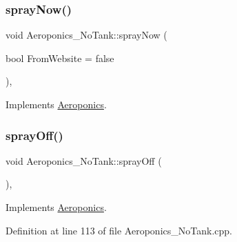\subsubsection{\texorpdfstring{spray\+Now()}{sprayNow()}\hspace{0.1cm}{\footnotesize\ttfamily [2/2]}}
{\footnotesize\ttfamily void Aeroponics\+\_\+\+No\+Tank\+::spray\+Now (\begin{DoxyParamCaption}\item[{bool}]{From\+Website = {\ttfamily false} }\end{DoxyParamCaption})\hspace{0.3cm}{\ttfamily [protected]}, {\ttfamily [virtual]}}



Implements \hyperlink{class_aeroponics_aecda76aae20ce45fd9a080770cf07e56}{Aeroponics}.

\mbox{\label{class_aeroponics___no_tank_a37537625cd3d80d6c49adeae298d4a76}} 
\subsubsection{\texorpdfstring{spray\+Off()}{sprayOff()}\hspace{0.1cm}{\footnotesize\ttfamily [1/2]}}
{\footnotesize\ttfamily void Aeroponics\+\_\+\+No\+Tank\+::spray\+Off (\begin{DoxyParamCaption}{ }\end{DoxyParamCaption})\hspace{0.3cm}{\ttfamily [protected]}, {\ttfamily [virtual]}}



Implements \hyperlink{class_aeroponics_a961b5818322eb6d0268d2f2f4763768e}{Aeroponics}.



Definition at line 113 of file Aeroponics\+\_\+\+No\+Tank.\+cpp.

